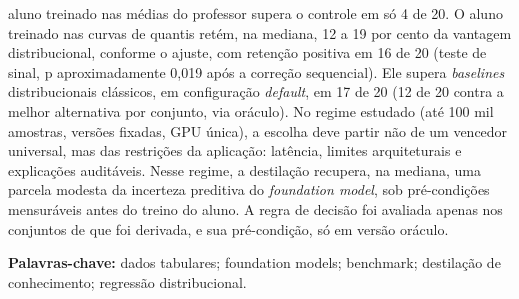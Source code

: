 aluno treinado nas médias do professor supera o controle em só 4 de 20. O aluno treinado nas curvas de quantis retém, na mediana, 12 a
19 por cento da vantagem distribucional, conforme o ajuste, com retenção positiva em 16 de 20 (teste de sinal, p aproximadamente 0,019
após a correção sequencial). Ele supera \emph{baselines} distribucionais
clássicos, em configuração \emph{default}, em 17 de 20 (12 de 20 contra a melhor alternativa por conjunto, via oráculo). No regime estudado (até 100 mil amostras,
versões fixadas, GPU única), a escolha deve partir não de um
vencedor universal, mas das restrições da aplicação: latência, limites
arquiteturais e explicações auditáveis. Nesse regime, a destilação
recupera, na mediana, uma parcela modesta da incerteza preditiva do
\emph{foundation model}, sob pré-condições mensuráveis antes do treino do
aluno. A regra de decisão foi avaliada apenas nos conjuntos de que foi derivada, e sua pré-condição, só em versão oráculo.

\vspace{0.4cm}
\noindent\textbf{Palavras-chave:} dados tabulares; foundation models;
benchmark; destilação de conhecimento; regressão distribucional.
